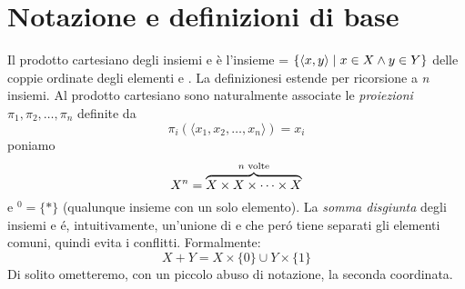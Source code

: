 \section{Notazione e definizioni di base}
Il prodotto cartesiano degli insiemi  e  è l'insieme  = $\{\langle x, y \rangle \hspace{1mm}|\hspace{1mm} x \in X \land y \in Y\}$ delle coppie ordinate degli elementi  e . La definizionesi estende per ricorsione a \textit{n} insiemi. Al prodotto cartesiano  sono naturalmente associate le \textit{proiezioni} $\pi_1, \pi_2, \dots, \pi_n$ definite da
\begin{equation}
    \pi_i(\langle x_1, x_2, \dots, x_n \rangle) = x_i
\end{equation}
poniamo
\begin{equation}
    X^n = \overbrace{X \times X \times \dots \times X}^{\textnormal{$n$ volte}}
\end{equation}
e $^0 = \{*\}$ (qualunque insieme con un solo elemento). La \textit{somma disgiunta} degli insiemi  e  é, intuitivamente, un'unione di  e  che peró tiene separati gli elementi comuni, quindi evita i conflitti. Formalmente:
\begin{equation}
    X + Y = X \times \{0\} \cup Y \times \{1\}
\end{equation}
Di solito ometteremo, con un piccolo abuso di notazione, la seconda coordinata.
